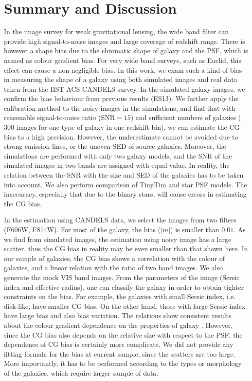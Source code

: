 \documentclass[useAMS,usenatbib]{mn2e}
\begin{document}
\section{Summary and Discussion}
In the image survey for weak gravitational lensing, the wide band
filter can provide high signal-to-noise images and large coverage of
redshift range. There is however a shape bias due to the chromatic
shape of galaxy and the PSF, which is named as colour gradient
bias. For very wide band surveys, such as Euclid, this effect can
cause a non-negligible bias.
%
In this work, we exam such a kind of bias in measuring the shape of a
galaxy using both simulated images and real data taken from the HST
ACS CANDELS survey. In the simulated galaxy images, we confirm the
bias behaviour from previous results (ES13). We further apply the
calibration method to the noisy images in the simulations, and find
that with reasonable signal-to-noise ratio (SNR$=15$) and sufficient
numbers of galaxies ($300$ images for one type of galaxy in one
redshift bin), we can estimate the CG bias to a high precision.
However, the underestimate cannot be avoided due to strong emission
lines, or the uneven SED of source galaxies. Moreover, the simulations
are performed with only two galaxy models, and the SNR of the
simulated images in two bands are assigned with equal value. In
reality, the relation between the SNR with the size and SED of the
galaxies has to be taken into account.
%
We also perform comparison of TinyTim and star PSF models. The
inaccuracy, especially that due to the binary stars, will cause errors
in estimating the CG bias.


In the estimation using CANDELS data, we select the images from two
filters (F606W, F814W). For most of the galaxy, the bias ($|m|$) is
smaller than $0.01$.  As we find from simulated images, the estimation
using noisy image has a large scatter, thus the CG bias in reality may
be even smaller than that shown here.
%
In our sample of galaxies, the CG bias shows a correlation with the
colour of galaxies, and a linear relation with the ratio of two band
images. We also generate the mock VIS band images. From the parameters
of the image (Sersic index and effective radius), one can classify the
galaxy in order to obtain tighter constraints on the bias. For example,
the galaxies with small Sersic index, i.e. disk-like, have smaller CG
bias. On the other hand, those with large Sersic index have large bias
and also bias variation. The relations show consistent results about
the colour gradient dependence on the properties of galaxy
\citep[e.g.][]{2010MNRAS.407..144T}. However, since the CG bias also
depends on the relative size with respect to the PSF, the dependence
of CG bias is certainly more complicate. We did not provide any
fitting formula for the bias at current sample, since the scatters are
too large. More importantly, it has to be performed according to the
types or morphology of the galaxies, which require larger sample of data.
\end{document}
